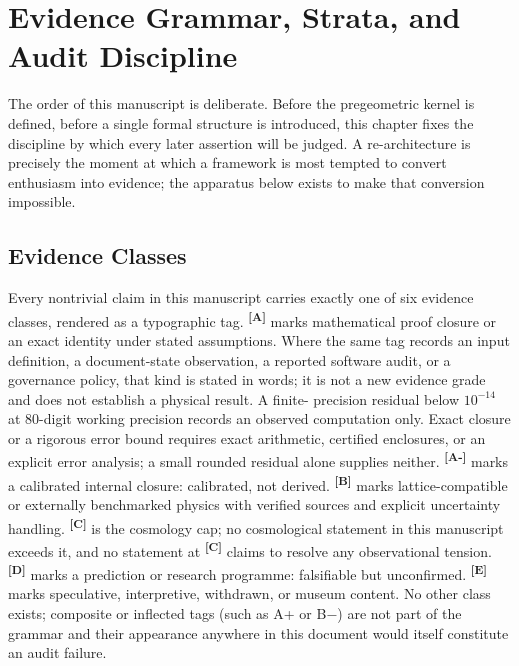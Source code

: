 \documentclass[12pt,a4paper,twoside]{article}
\theoremstyle{plain}
\theoremstyle{definition}
\theoremstyle{remark}
\newcommand{\catmark}[1]{\textsuperscript{\textsf{\textbf{[#1]}}}}
\begin{document}
\newpage

\setcounter{secnumdepth}{0}
\section{Evidence Grammar, Strata, and Audit Discipline}
\label{sec:evidence-apparatus}

\noindent The order of this manuscript is deliberate. Before the
pregeometric kernel is defined, before a single formal structure is
introduced, this chapter fixes the discipline by which every later
assertion will be judged. A re-architecture is precisely the moment at
which a framework is most tempted to convert enthusiasm into evidence; the
apparatus below exists to make that conversion impossible.

\subsection{Evidence Classes}
\label{subsec:evidence-classes}

Every nontrivial claim in this manuscript carries exactly one of six evidence
classes, rendered as a typographic tag. \catmark{A} marks mathematical
proof closure or an exact identity under stated assumptions. Where the same
tag records an input definition, a document-state observation, a reported
software audit, or a governance policy, that kind is stated in words; it is
not a new evidence grade and does not establish a physical result. A finite-
precision residual below $10^{-14}$ at 80-digit working precision records an
observed computation only. Exact closure or a rigorous error bound requires
exact arithmetic, certified enclosures, or an explicit error analysis; a small
rounded residual alone supplies neither. \catmark{A-} marks a
calibrated internal closure: calibrated, not derived. \catmark{B} marks
lattice-compatible or externally benchmarked physics with verified sources
and explicit uncertainty handling. \catmark{C} is the cosmology cap; no
cosmological statement in this manuscript exceeds it, and no statement at
\catmark{C} claims to resolve any observational tension. \catmark{D} marks
a prediction or research programme: falsifiable but unconfirmed.
\catmark{E} marks speculative, interpretive, withdrawn, or museum content.
No other class exists; composite or inflected tags (such as A+ or B$-$)
are not part of the grammar and their appearance anywhere in this document
would itself constitute an audit failure.
\end{document}
